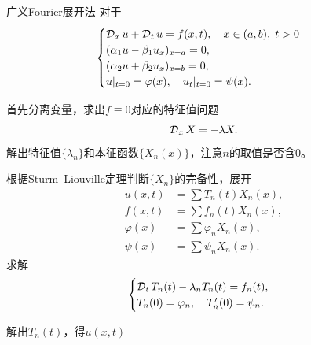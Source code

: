 \begin{method}{广义Fourier展开法}{}
	对于 
	\begin{align*}
		\begin{cases}
			\operatorname{\mathcal D}_xu + \operatorname{\mathcal D}_tu = f(x,t),\quad x \in (a,b),\;t > 0\\
			(\alpha_1u - \beta_1u_x)_{x=a} = 0,\\
			(\alpha_2u + \beta_2u_x)_{x=b} = 0,\\
			{u}\rvert_{t=0} = \varphi(x),\quad{u_t}\rvert_{t=0} = \psi(x).
		\end{cases}
	\end{align*}
	\begin{compactenum}
		\item 首先分离变量，求出$f \equiv 0$对应的特征值问题
		\[
			\operatorname{\mathcal D}_xX = -\lambda X.
		\]
		解出特征值$\{\lambda_n\}$和本征函数$\{X_n(x)\}$，注意$n$的取值是否含0。
		\item 根据Sturm--Liouville定理判断$\{X_n\}$的完备性，展开
		\begin{align*}
			u(x,t) &= \sum T_n(t)X_n(x),\\
			f(x,t) &= \sum f_n(t)X_n(x),\\
			\varphi(x) &= \sum\varphi_nX_n(x),\\
			\psi(x) &= \sum\psi_nX_n(x).
		\end{align*}
		求解
		\begin{equation}
			\label{eq:mmp-forced-modal-equations}
			\begin{cases}
				\operatorname{\mathcal D}_tT_n(t) - \lambda_nT_n(t) = f_n(t),\\
				T_n(0) = \varphi_n,\quad T_n'(0) = \psi_n.
			\end{cases}
		\end{equation}
		\item 解出$T_n(t)$，得$u(x,t)$
	\end{compactenum}
\end{method}

